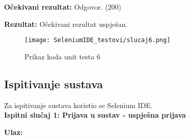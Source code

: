 	\noindent\textbf{Očekivani rezultat:}
		Odgovor. (200)
		
	\noindent\textbf{Rezultat:}
		Očekivani rezultat uspješan.
				
				\begin{figure}[H]
					\texttt{[image: SeleniumIDE\_testovi/slucaj6.png]}
					\centering
					\caption{Prikaz koda unit testa 6}
					\label{fig:kod_test6}
				\end{figure}
			
			
			
			\subsection{Ispitivanje sustava}
			
%			 
%			

Za ispitivanje sustava koristio se Selenium IDE.\\

\noindent\textbf{Ispitni slučaj 1: Prijava u sustav - uspješna prijava}
			
				\noindent\textbf{Ulaz:}
				
